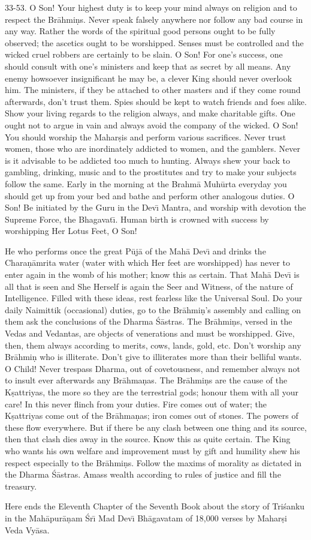 33-53. O Son! Your highest duty is to keep your mind always on religion and to respect the Br\=ahmi\d{n}s. Never speak falsely anywhere nor follow any bad course in any way. Rather the words of the spiritual good persons ought to be fully observed; the ascetics ought to be worshipped. Senses must be controlled and the wicked cruel robbers are certainly to be slain. O Son! For one's success, one should consult with one's ministers and keep that as secret by all means. Any enemy howsoever insignificant he may be, a clever King should never overlook him. The ministers, if they be attached to other masters and if they come round afterwards, don't trust them. Spies should be kept to watch friends and foes alike. Show your living regards to the religion always, and make charitable gifts. One ought not to argue in vain and always avoid the company of the wicked. O Son! You should worship the Mahar\d{s}is and perform various sacrifices. Never trust women, those who are inordinately addicted to women, and the gamblers. Never is it advisable to be addicted too much to hunting. Always shew your back to gambling, drinking, music and to the prostitutes and try to make your subjects follow the same. Early in the morning at the Brahm\=a Muh\=urta everyday you should get up from your bed and bathe and perform other analogous duties. O Son! Be initiated by the Guru in the Dev\={\i} Mantra, and worship with devotion the Supreme Force, the Bhagavat\={\i}. Human birth is crowned with success by worshipping Her Lotus Feet, O Son!

He who performs once the great P\=uj\=a of the Mah\=a Dev\={\i} and drinks the Chara\d{n}\=amrita water (water with which Her feet are worshipped) has never to enter again in the womb of his mother; know this as certain. That Mah\=a Dev\={\i} is all that is seen and She Herself is again the Seer and Witness, of the nature of Intelligence. Filled with these ideas, rest fearless like the Universal Soul. Do your daily Naimittik (occasional) duties, go to the Br\=ahmi\d{n}'s assembly and calling on them ask the conclusions of the Dharma \'S\=astras. The Br\=ahmi\d{n}s, versed in the Vedas and Vedantas, are objects of venerations and must be worshipped. Give, then, them always according to merits, cows, lands, gold, etc. Don't worship any Br\=ahmi\d{n} who is illiterate. Don't give to illiterates more than their belliful wants. O Child! Never trespass Dharma, out of covetousness, and remember always not to insult ever afterwards any Br\=ahma\d{n}as. The Br\=ahmi\d{n}s are the cause of the K\d{s}attriyas, the more so they are the terrestrial gods; honour them with all your care! In this never flinch from your duties. Fire comes out of water; the K\d{s}attriyas come out of the Br\=ahma\d{n}as; iron comes out of stones. The powers of these flow everywhere. But if there be any clash between one thing and its source, then that clash dies away in the source. Know this as quite certain. The King who wants his own welfare and improvement must by gift and humility shew his respect especially to the Br\=ahmi\d{n}s. Follow the maxims of morality as dictated in the Dharma \'S\=astras. Amass wealth according to rules of justice and fill the treasury.

Here ends the Eleventh Chapter of the Seventh Book about the story of Tri\'sanku in the Mah\=apur\=a\d{n}am \'Sr\={\i} Mad Dev\={\i} Bh\=agavatam of 18,000 verses by Mahar\d{s}i Veda Vy\=asa.



